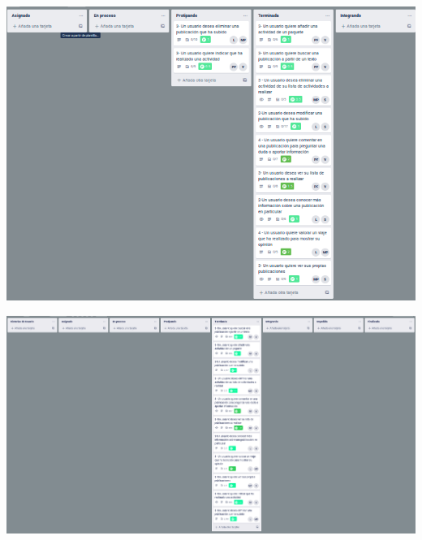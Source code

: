 \documentclass[spanish]{beamer}
\begin{document}
\begin{frame}
	\begin{center}
		\includegraphics[scale=0.4]{trello2_7}
	\end{center}
\end{frame}

\begin{frame}
	\begin{center}
	\end{center}
\end{frame}

\begin{frame}
	\begin{center}
		\includegraphics[scale=0.27]{trello2_8}
	\end{center}
\end{frame}

\begin{frame}
	\begin{center}
	\end{center}
\end{frame}
\end{document}
